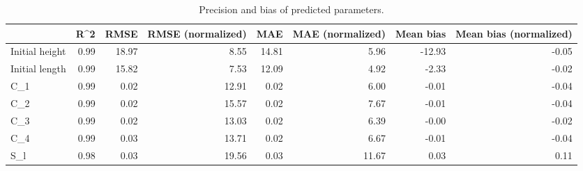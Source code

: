 










\begin{table}[t]
  \caption{Precision and bias of predicted parameters.}
  \begin{tabular}{lrrrrrrr}
    \hline
    {} &  R\textasciicircum 2 &  RMSE &  RMSE (normalized) &   MAE &  MAE (normalized) &  Mean bias &  Mean bias (normalized) \\
    \hline
    Initial height & 0.99 & 18.97 &               8.55 & 14.81 &              5.96 &     -12.93 &                   -0.05 \\
    Initial length & 0.99 & 15.82 &               7.53 & 12.09 &              4.92 &      -2.33 &                   -0.02 \\
    C\_1            & 0.99 &  0.02 &              12.91 &  0.02 &              6.00 &      -0.01 &                   -0.04 \\
    C\_2            & 0.99 &  0.02 &              15.57 &  0.02 &              7.67 &      -0.01 &                   -0.04 \\
    C\_3            & 0.99 &  0.02 &              13.03 &  0.02 &              6.39 &      -0.00 &                   -0.02 \\
    C\_4            & 0.99 &  0.03 &              13.71 &  0.02 &              6.67 &      -0.01 &                   -0.04 \\
    S\_l            & 0.98 &  0.03 &              19.56 &  0.03 &             11.67 &       0.03 &                    0.11 \\
  \hline
    \end{tabular}
  \label{table:bias_errors}
\end{table}


